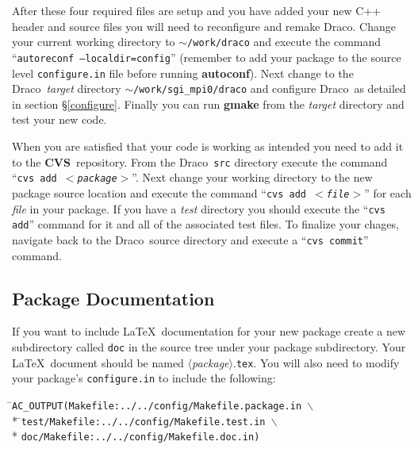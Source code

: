 \documentclass[11pt]{nmemo}
\newcommand{\comp}[1]{\normalfont\footnotesize\texttt{#1}\normalsize}
\newcommand{\draco}{{\normalfont\sffamily Draco}}
\newcommand{\cvs}{{\normalfont\bfseries CVS}}
\begin{document}
After these four required files are setup and you have added your new
C++ header and source files you will need to reconfigure and remake
\draco.  Change your current working directory to
\comp{$\sim$/work/draco} and execute the command ``\comp{autoreconf
  --localdir=config}'' (remember to add your package to the source
level \comp{configure.in} file before running \textbf{autoconf}).
Next change to the \draco\ \emph{target} directory
\comp{$\sim$/work/sgi\_mpi0/draco} and configure \draco\ as detailed
in section \S\ref{configure}.  Finally you can run \textbf{gmake} from
the \emph{target} directory and test your new code.

When you are satisfied that your code is working as intended you need
to add it to the \cvs\ repository.  From the \draco\ \comp{src}
directory execute the command ``\comp{cvs add $<$\emph{package}$>$}''.
Next change your working directory to the new package source location
and execute the command ``\comp{cvs add $<$\emph{file}$>$}'' for each
\emph{file} in your package.  If you have a \emph{test} directory you
should execute the ``\comp{cvs add}'' command for it and all of the
associated test files.  To finalize your chages, navigate back to the
\draco\ source directory and execute a ``\comp{cvs commit}'' command.

\subsection{Package Documentation}

If you want to include \LaTeX\ documentation for your new package
create a new subdirectory called \comp{doc} in the source tree under
your package subdirectory.  Your \LaTeX\ document should be named
$\langle$\emph{package}$\rangle$.\comp{tex}.  You will also need to
modify your package's \comp{configure.in} to include the following:

\footnotesize
\begin{tabbing}
\hspace{0.5in}\=\comp{AC\_OUTPUT(Makefile:../../config/Makefile.package.in $\backslash$} \\*
\>\hspace{0.5in}\=\comp{test/Makefile:../../config/Makefile.test.in $\backslash$} \\*
\>\>\comp{doc/Makefile:../../config/Makefile.doc.in)}
\end{tabbing}
\normalsize

\end{document}
